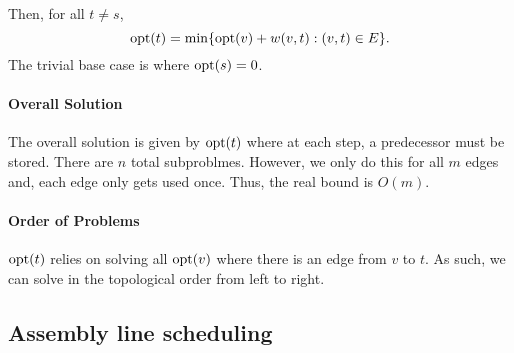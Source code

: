 Then, for all \(t \neq s\),  \[
  \mathrm{opt}(t) = \min \{
    \mathrm{opt}(v) + w(v, t) : (v, t) \in E
  \} 
.\] 
The trivial base case is where \(\mathrm{opt}(s) = 0\).

\paragraph{Overall Solution}
The overall solution is given by \(\mathrm{opt}(t)\) where at each step, a predecessor must be stored.
There are \(n\) total subproblmes. However, we only do this  for all \(m\) edges and,
each edge only gets used once. Thus, the real bound is  \(O(m)\).

\paragraph{Order of Problems}
\(\mathrm{opt}(t)\) relies on solving all  \(\mathrm{opt}(v)\) where there is an edge from \(v\) to  \(t\).
As such, we can solve in the topological order from left to right.

\subsection{Assembly line scheduling}





